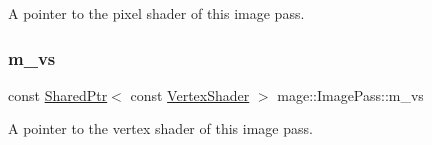 A pointer to the pixel shader of this image pass. \hypertarget{classmage_1_1_image_pass_a2539697e993d9855fba607e783e13edf}{}\label{classmage_1_1_image_pass_a2539697e993d9855fba607e783e13edf} 
\subsubsection{\texorpdfstring{m\+\_\+vs}{m\_vs}}
{\footnotesize\ttfamily const \hyperlink{namespacemage_a1e01ae66713838a7a67d30e44c67703e}{Shared\+Ptr}$<$ const \hyperlink{classmage_1_1_vertex_shader}{Vertex\+Shader} $>$ mage\+::\+Image\+Pass\+::m\+\_\+vs\hspace{0.3cm}{\ttfamily [private]}}

A pointer to the vertex shader of this image pass. 